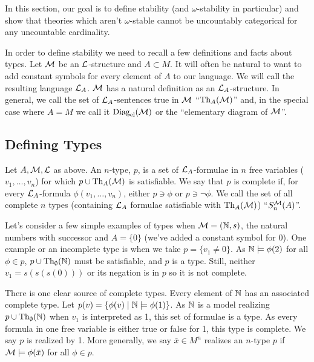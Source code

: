 In this section, our goal is to define stability (and \(\omega\)-stability in particular) and show that theories which aren't \(\omega\)-stable cannot be uncountably categorical for any uncountable cardinality. 

In order to define stability we need to recall a few definitions and facts about types. 
Let \(\mathcal{M}\) be an \(\mathcal{L}\)-structure and \(A \subset M\). 
It will often be natural to want to add constant symbols for every element of \(A\) to our language. 
We will call the resulting language \(\mathcal{L}_A\). \(\mathcal{M}\) has a natural definition as an \(\mathcal{L}_A\)-structure. 
In general, we call the set of \(\mathcal{L}_A\)-sentences true in \(\mathcal{M}\) ``\(\text{Th}_A(\mathcal{M})\)'' and, in the special case where \(A = M\) we call it \(\text{Diag}_\text{el}(\mathcal{M})\) or the ``elementary diagram of \(\mathcal{M}\)''. 

\subsection{Defining Types}

\begin{definition}\label{def_types}
Let \(A, \mathcal{M}, \mathcal{L}\) as above. 
An \(n\)-type, \(p\), is a set of \(\mathcal{L}_A\)-formulae in \(n\) free variables (\(v_1, \ldots, v_n\)) for which \(p \cup \text{Th}_A(\mathcal{M})\) is satisfiable.
We say that \(p\) is complete if, for every \(\mathcal{L}_A\)-formula \(\phi(v_1, \ldots, v_n)\), either \(p \ni \phi\) or \(p \ni \neg \phi\). 
We call the set of all complete \(n\) types (containing \(\mathcal{L}_A\) formulae satisfiable with \(\text{Th}_A(\mathcal{M})\)) ``\(S_n^{\mathcal{M}}(A)\)''. 
\end{definition}

Let's consider a few simple examples of types when  \(\mathcal{M} = (\mathbb{N},s)\), the natural numbers with successor and \(A = \{0\}\) (we've added a constant symbol for 0). 
One example or an incomplete type is when we take \(p = \{v_1 \neq 0\}\). 
As \(\mathbb{N} \models \phi(2)\) for all \(\phi \in p\), \(p \cup \text{Th}_\emptyset(\mathbb{N})\) must be satisfiable, and \(p\) is a type. 
Still, neither \(v_1 = s(s(s(0)))\) or its negation is in \(p\) so it is not complete. 

There is one clear source of complete types. 
Every element of \(\mathbb{N}\) has an associated complete type. 
Let \(p(v) = \{\phi(v) \mid \mathbb{N} \models \phi(1)\}\). 
As \(\mathbb{N}\) is a model realizing \(p \cup \text{Th}_\emptyset(\mathbb{N})\) when \(v_1\) is interpreted as 1, this set of formulae is a type. 
As every formula in one free variable is either true or false for 1, this type is complete. 
We say \(p\) is realized by 1. 
More generally, we say \(\bar{x} \in M^n\) realizes an \(n\)-type \(p\) if \(\mathcal{M} \models \phi(\bar{x})\) for all \(\phi \in p\).  

